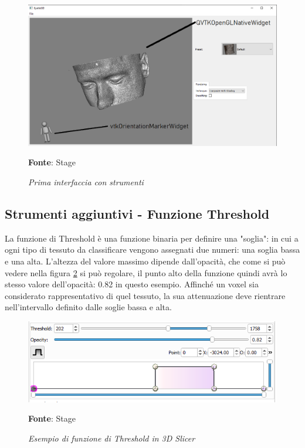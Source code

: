 \begin{figure}[h]
    \centering
    \includegraphics[width=1\textwidth]{immagini/svolgimento/basicwidget.png}
    \caption{\textit{Prima interfaccia con strumenti}}
    \textbf{Fonte}: Stage
    \label{fig: basicwidget}
\end{figure}

\subsection{Strumenti aggiuntivi - Funzione Threshold}
La funzione di Threshold è una funzione binaria per definire una "soglia": in cui a ogni tipo di tessuto da classificare vengono assegnati due numeri: una soglia bassa e una alta. L'altezza del valore massimo dipende dall'opacità, che come si può vedere nella figura \ref{fig: Threshold} si può regolare, il punto alto della funzione quindi avrà lo stesso valore dell'opacità: 0.82 in questo esempio. Affinché un voxel sia considerato rappresentativo di quel tessuto, la sua attenuazione deve rientrare nell'intervallo definito dalle soglie bassa e alta.

\begin{figure}[h]
    \centering
    \includegraphics[width=1\textwidth]{immagini/svolgimento/slicerthreshold.png}
    \caption{\textit{Esempio di funzione di Threshold in 3D Slicer}}
    \textbf{Fonte}: Stage
    \label{fig: Threshold}
\end{figure}

